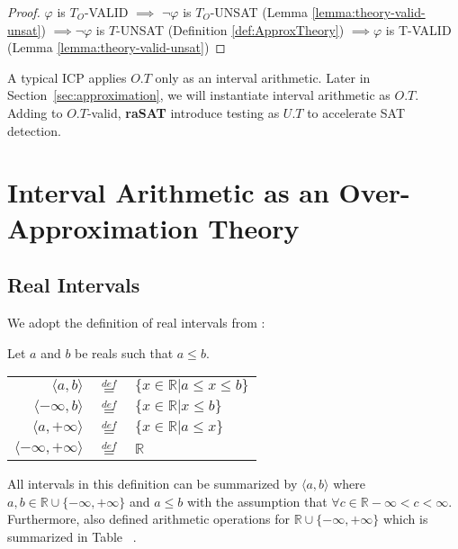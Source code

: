 \begin{proof}
$\varphi$ is $T_O$-VALID $\implies$ $\neg\varphi$ is $T_O$-UNSAT (Lemma \ref{lemma:theory-valid-unsat}) $\implies \neg\varphi$ is $T$-UNSAT (Definition \ref{def:ApproxTheory}) $\implies \varphi$ is T-VALID (Lemma \ref{lemma:theory-valid-unsat})
\end{proof}

A typical ICP applies $O.T$ only as an interval arithmetic. 
Later in Section~\ref{sec:approximation}, we will instantiate interval arithmetic as $O.T$. 
Adding to $O.T$-valid, {\bf raSAT} introduce testing as $U.T$ to accelerate SAT detection. 

\section{Interval Arithmetic as an Over-Approximation Theory}\label{sec:IA}
\subsection{Real Intervals}
We adopt the definition of real intervals from \cite{Hickey:2001:IAP:502102.502106}:
\begin{definition}\cite{Hickey:2001:IAP:502102.502106}
Let $a$ and $b$ be reals such that $a \le b$.
\begin{center}
\begin{tabular}{ r c l }
  $\langle a, b \rangle$ & $\overset{def}{=}$ & $\{x \in \mathbb{R} | a \le x \le b\}$ \\
  $\langle -\infty, b \rangle$ & $\overset{def}{=}$ & $\{x \in \mathbb{R} | x \le b\}$ \\
  $\langle a, +\infty \rangle$ & $\overset{def}{=}$ & $\{x \in \mathbb{R} | a \le x\}$ \\  
  $\langle -\infty, +\infty \rangle$ & $\overset{def}{=}$ & $\mathbb{R}$ \\  
\end{tabular}
\end{center}
\end{definition}
All intervals in this definition can be summarized by $\langle a, b \rangle$ where $a, b \in \mathbb{R} \cup \{-\infty, +\infty\}$ and $a \le b$ with the assumption that $\forall c \in \mathbb{R}-\infty < c < \infty$. Furthermore,\citet{Hickey:2001:IAP:502102.502106} also defined arithmetic operations for $\mathbb{R} \cup \{-\infty, +\infty\}$ which is summarized in Table ~.

